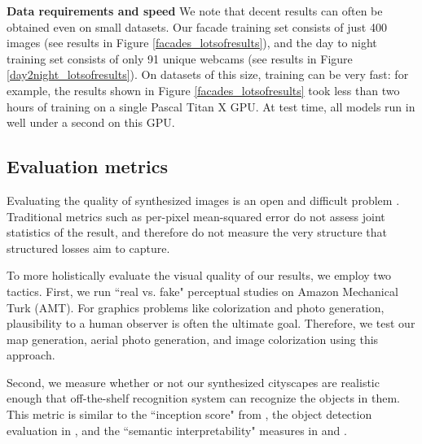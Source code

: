 {\bf Data requirements and speed} We note that decent results can often be obtained even on small datasets. Our facade training set consists of just 400 images (see results in Figure \ref{facades_lotsofresults}), and the day to night training set consists of only 91 unique webcams (see results in Figure \ref{day2night_lotsofresults}). On datasets of this size, training can be very fast: for example, the results shown in Figure \ref{facades_lotsofresults} took less than two hours of training on a single Pascal Titan X GPU. At test time, all models run in well under a second on this GPU.

\subsection{Evaluation metrics} Evaluating the quality of synthesized images is an open and difficult problem \cite{salimans2016improved}. Traditional metrics such as per-pixel mean-squared error do not assess joint statistics of the result, and therefore do not measure the very structure that structured losses aim to capture.

To more holistically evaluate the visual quality of our results, we employ two tactics. First, we run ``real vs. fake" perceptual studies on Amazon Mechanical Turk (AMT). For graphics problems like colorization and photo generation, plausibility to a human observer is often the ultimate goal. Therefore, we test our map generation, aerial photo generation, and image colorization using this approach.

Second, we measure whether or not our synthesized cityscapes are realistic enough that off-the-shelf recognition system can recognize the objects in them. This metric is similar to the ``inception score" from \cite{salimans2016improved}, the object detection evaluation in \cite{wang2016generative}, and the ``semantic interpretability" measures in \cite{zhang2016colorful} and \cite{owens2016visually}.

